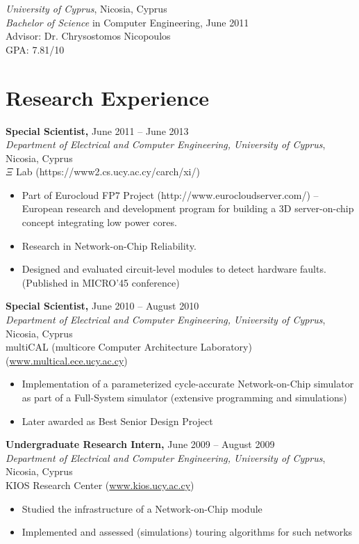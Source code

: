 \documentclass[11pt]{myres} %
\begin{document}
\begin{resume}
	\emph{University of Cyprus}, Nicosia, Cyprus \\
	\emph{Bachelor of Science} in Computer Engineering, June 2011 \\
	Advisor: Dr. Chrysostomos Nicopoulos \\
	GPA: 7.81/10
 
\section{Research Experience}

{\color{blue}\textbf{Special Scientist,} June 2011 -- June 2013} \\
\emph{Department of Electrical and Computer Engineering, University of Cyprus}, Nicosia, Cyprus \\
$\Xi$ Lab (https://www2.cs.ucy.ac.cy/carch/xi/) \\
\begin{itemize} \itemsep -2pt
	\item Part of Eurocloud FP7 Project (http://www.eurocloudserver.com/) -- European research and development program for building a 3D server-on-chip concept integrating low power cores.
	\item Research in Network-on-Chip Reliability.
	\item Designed and evaluated circuit-level modules to detect hardware faults. (Published in MICRO'45 conference)
\end{itemize}

{\color{blue}\textbf{Special Scientist,} June 2010 -- August 2010} \\
\emph{Department of Electrical and Computer Engineering, University of Cyprus}, Nicosia, Cyprus \\
multiCAL (multicore Computer Architecture Laboratory) (\url{www.multical.ece.ucy.ac.cy}) \\
\begin{itemize} \itemsep -2pt
	\item Implementation of a parameterized cycle-accurate Network-on-Chip simulator as part of a Full-System simulator (extensive programming and simulations)
	\item Later awarded as Best Senior Design Project
\end{itemize}
 
{\color{blue}\textbf{Undergraduate Research Intern,} June 2009 -- August 2009} \\
\emph{Department of Electrical and Computer Engineering, University of Cyprus}, Nicosia, Cyprus \\ 
KIOS Research Center (\url{www.kios.ucy.ac.cy}) \\
\begin{itemize} \itemsep -2pt
	\item Studied the infrastructure of a Network-on-Chip module
	\item Implemented and assessed (simulations) touring algorithms for such networks
\end{itemize}


\end{resume}
\end{document}
